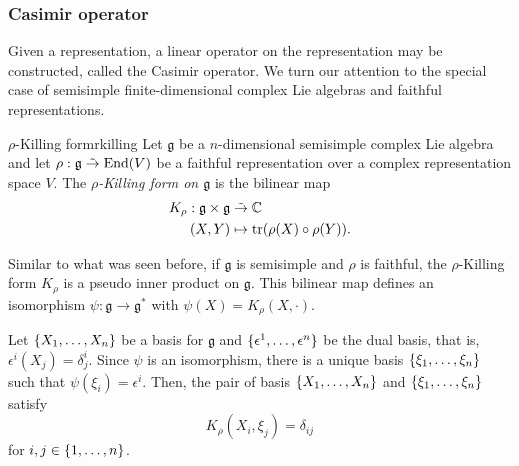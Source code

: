 \subsubsection{Casimir operator}
Given a representation, a linear operator on the representation may be constructed, called the Casimir operator. We turn our attention to the special case of semisimple finite-dimensional complex Lie algebras and faithful representations.

\begin{definition}{\(\rho\)-Killing form}{rkilling}
    Let \(\mathfrak{g}\) be a \(n\)-dimensional semisimple complex Lie algebra and let \(\rho : \mathfrak{g} \mathrel{\tilde{\to}} \operatorname{End}(V)\) be a faithful representation over a complex representation space \(V\). The \emph{\(\rho\)-Killing form on \(\mathfrak{g}\)} is the bilinear map
    \begin{align*}
        K_{\rho} : \mathfrak{g} \times \mathfrak{g} &\mathrel{\tilde{\to}} \mathbb{C}\\
                                              (X,Y) &\mapsto \operatorname{tr}(\rho(X) \circ \rho(Y)).
    \end{align*}
\end{definition}

Similar to what was seen before, if \(\mathfrak{g}\) is semisimple and \(\rho\) is faithful, the \(\rho\)-Killing form \(K_\rho\) is a pseudo inner product on \(\mathfrak{g}\). This bilinear map defines an isomorphism \(\psi : \mathfrak{g} \to \mathfrak{g}^{\ast}\) with \(\psi(X) = K_\rho(X, \cdot)\).

Let \(\{X_1, \dots, X_n\}\) be a basis for \(\mathfrak{g}\) and \(\{\epsilon^1, \dots, \epsilon^n\}\) be the dual basis, that is, \(\epsilon^i(X_j) = \delta^i_j\). Since \(\psi\) is an isomorphism, there is a unique basis \(\{\xi_1, \dots, \xi_n\}\) such that \(\psi(\xi_i) = \epsilon^i.\) Then, the pair of basis \(\{X_1, \dots, X_n\}\) and \(\{\xi_1, \dots, \xi_n\}\) satisfy
\begin{equation*}
    K_\rho (X_i, \xi_j) = \delta_{ij}
\end{equation*}
for \(i,j \in \{1,\dots, n\}\).

